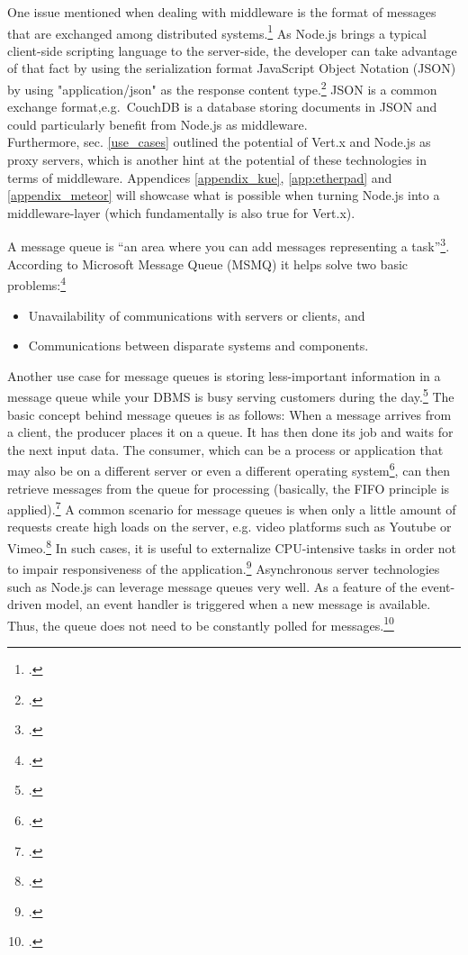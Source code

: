 \begin{appendices}
\begin{subappendices}
One issue mentioned when dealing with middleware is the format of messages that are exchanged among distributed systems.\footcite[149]{Tannenbaum_2007} As Node.js brings a typical client-side scripting language to the server-side, the developer can take advantage of that fact by using the serialization format JavaScript Object Notation (JSON) by using "application/json" as the response content type.\footcite[Cf.][]{rfc4627} JSON is a common exchange format,e.g.\ CouchDB is a database storing documents in JSON and could particularly benefit from Node.js as middleware.\\

Furthermore, sec. \ref{use_cases}  outlined the potential of Vert.x and Node.js as proxy servers, which is another hint at the potential of these technologies in terms of middleware. Appendices \ref{appendix_kue}, \ref{app:etherpad} and \ref{appendix_meteor} will showcase what is possible when turning Node.js into a middleware-layer (which fundamentally is also true for Vert.x). 
\newpage

\label{appendix_kue}

A message queue is “an area where you can add messages representing a task”\footcite[][]{McGlennon_2007}. According to Microsoft Message Queue (MSMQ) it helps solve two basic problems:\footcite[Cf.][]{McGlennon_2007}
\begin{itemize}
  \item Unavailability of communications with servers or clients, and 
  \item Communications between disparate systems and components.
\end{itemize}
Another use case for message queues is storing less-important information in a message queue while your DBMS is busy serving customers during the day.\footcite[Cf.][449]{Thomson_2002}
The basic concept behind message queues is as follows: When a message arrives from a client, the producer places it on a queue. It has then done its job and waits for the next input data. The consumer, which can be a process or application that may also be on a different server or even a different operating system\footcite[Cf.][]{McGlennon_2007}, can then retrieve messages from the queue for processing (basically, the FIFO principle is applied).\footcite[Cf.][450]{Thomson_2002}
A common scenario for message queues is when only a little amount of requests create high loads on the server, e.g. video platforms such as Youtube or Vimeo.\footcite[Cf.][247]{Roden_2012} In such cases, it is useful to externalize CPU-intensive tasks in order not to impair responsiveness of the application.\footcite[Cf.][247]{Roden_2012}
Asynchronous server technologies such as Node.js can leverage message queues very well. As a feature of the event-driven model, an event handler is triggered when a new message is available. Thus, the queue does not need to be constantly polled for messages.\footcite[Cf.][]{Knight_2011}


\end{subappendices}
\end{appendices}
